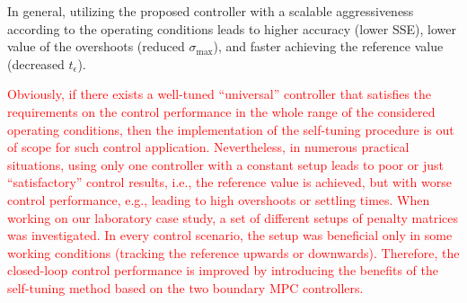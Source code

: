 \documentclass[preprint,12pt]{elsarticle}
\newcommand{\change}[1]{\textcolor{red}{#1}}
\begin{document}



	In general, utilizing the proposed controller with a scalable aggressiveness according to the operating conditions leads to higher accuracy (lower SSE), lower value of the overshoots (reduced $\sigma_{\mathrm{max}}$), and faster achieving the reference value (decreased $t_{\epsilon}$).

	\change{Obviously, if there exists a well-tuned ``universal'' controller that satisfies the requirements on the control performance in the whole range of the considered operating conditions, then the implementation of the self-tuning procedure is out of scope for such control application. Nevertheless, in numerous practical situations, using only one controller with a constant setup leads to poor or just ``satisfactory'' control results, i.e., the reference value is achieved, but with worse control performance, e.g., leading to high overshoots or settling times. When working on our laboratory case study, a set of different setups of penalty matrices was investigated. In every control scenario, the setup was beneficial only in some working conditions (tracking the reference upwards or downwards). Therefore, the closed-loop control performance is improved by introducing the benefits of the self-tuning method based on the two boundary MPC controllers.}
\end{document}
